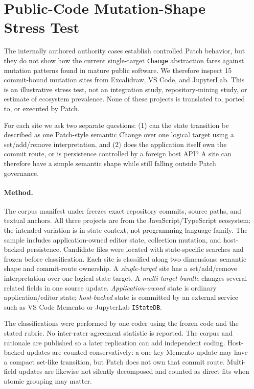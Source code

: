 \section{Public-Code Mutation-Shape Stress Test}
\label{sec:real-code-audit}

The internally authored authority cases establish controlled Patch behavior, but they do not show how the current single-target \texttt{Change} abstraction fares against mutation patterns found in mature public software. We therefore inspect 15 commit-bound mutation sites from Excalidraw, VS Code, and JupyterLab. This is an illustrative stress test, not an integration study, repository-mining study, or estimate of ecosystem prevalence. None of these projects is translated to, ported to, or executed by Patch.

For each site we ask two separate questions: (1) can the state transition be described as one Patch-style semantic Change over one logical target using a set/add/remove interpretation, and (2) does the application itself own the commit route, or is persistence controlled by a foreign host API? A site can therefore have a simple semantic shape while still falling outside Patch governance.

\paragraph{Method.}
The corpus manifest under  freezes exact repository commits, source paths, and textual anchors. All three projects are from the JavaScript/TypeScript ecosystem; the intended variation is in state context, not programming-language family. The sample includes application-owned editor state, collection mutation, and host-backed persistence. Candidate files were located with state-specific searches and frozen before classification. Each site is classified along two dimensions: semantic shape and commit-route ownership. A \emph{single-target} site has a set/add/remove interpretation over one logical state target. A \emph{multi-target bundle} changes several related fields in one source update. \emph{Application-owned} state is ordinary application/editor state; \emph{host-backed} state is committed by an external service such as VS Code Memento or JupyterLab \texttt{IStateDB}.

The classifications were performed by one coder using the frozen code and the stated rubric. No inter-rater agreement statistic is reported. The corpus and rationale are published so a later replication can add independent coding. Host-backed updates are counted conservatively: a one-key Memento update may have a compact set-like transition, but Patch does not own that commit route. Multi-field updates are likewise not silently decomposed and counted as direct fits when atomic grouping may matter.

